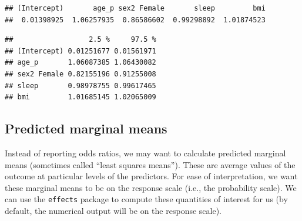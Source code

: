 \documentclass[]{book}
\newenvironment{Shaded}{\begin{snugshade}}{\end{snugshade}}
\newcommand{\CommentTok}[1]{\textcolor[rgb]{0.56,0.35,0.01}{\textit{#1}}}
\newcommand{\DataTypeTok}[1]{\textcolor[rgb]{0.13,0.29,0.53}{#1}}
\newcommand{\KeywordTok}[1]{\textcolor[rgb]{0.13,0.29,0.53}{\textbf{#1}}}
\newcommand{\NormalTok}[1]{#1}
\newcommand{\OperatorTok}[1]{\textcolor[rgb]{0.81,0.36,0.00}{\textbf{#1}}}
\newcommand{\StringTok}[1]{\textcolor[rgb]{0.31,0.60,0.02}{#1}}
\begin{document}
\begin{verbatim}
## (Intercept)       age_p sex2 Female       sleep         bmi 
##  0.01398925  1.06257935  0.86586602  0.99298892  1.01874523
\end{verbatim}

\begin{Shaded}
\end{Shaded}

\begin{verbatim}
##                  2.5 %     97.5 %
## (Intercept) 0.01251677 0.01561971
## age_p       1.06087385 1.06430082
## sex2 Female 0.82155196 0.91255008
## sleep       0.98978755 0.99617465
## bmi         1.01685145 1.02065009
\end{verbatim}

\hypertarget{predicted-marginal-means}{%
\subsection{Predicted marginal means}\label{predicted-marginal-means}}

Instead of reporting odds ratios, we may want to calculate predicted marginal means (sometimes called ``least squares means''). These are average values of the outcome at particular levels of the predictors. For ease of interpretation, we want these marginal means to be on the response scale (i.e., the probability scale). We can use the \texttt{effects} package to compute these quantities of interest for us (by default, the numerical output will be on the response scale).

\begin{Shaded}
\end{Shaded}
\end{document}

